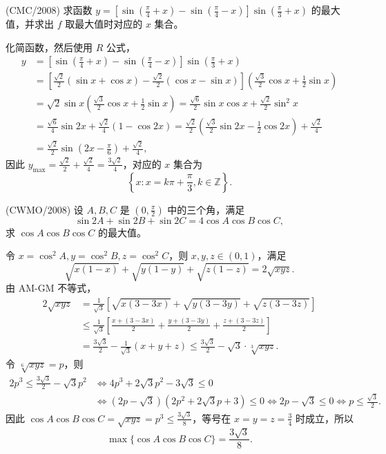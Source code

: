 \begin{questions}
\question (CMC/2008) 求函数 $y = \left[ \sin \left( \frac{\pi}{4} + x \right) - \sin \left( \frac{\pi}{4} - x \right) \right] \sin \left( \frac{\pi}{3} + x \right)$ 的最大值，并求出 $f$ 取最大值时对应的 $x$ 集合。
\begin{solution}
化简函数，然后使用 $R$ 公式，
\begin{align*}
y &= \left[ \sin \left( \frac{\pi}{4} + x \right) - \sin \left( \frac{\pi}{4} - x \right) \right] \sin \left( \frac{\pi}{3} + x \right) \\
&= \left[ \frac{\sqrt{2}}{2} (\sin x + \cos x) - \frac{\sqrt{2}}{2} (\cos x - \sin x) \right] \left( \frac{\sqrt{3}}{2} \cos x + \frac{1}{2} \sin x \right) \\
&= \sqrt{2} \sin x \left( \frac{\sqrt{3}}{2} \cos x + \frac{1}{2} \sin x \right) = \frac{\sqrt{6}}{2} \sin x \cos x + \frac{\sqrt{2}}{2} \sin^2 x \\
&= \frac{\sqrt{6}}{4} \sin 2x + \frac{\sqrt{2}}{4} (1 - \cos 2x) = \frac{\sqrt{2}}{2} \left( \frac{\sqrt{3}}{2} \sin 2x - \frac{1}{2} \cos 2x \right) + \frac{\sqrt{2}}{4} \\
&= \frac{\sqrt{2}}{2} \sin \left( 2x - \frac{\pi}{6} \right) + \frac{\sqrt{2}}{4},
\end{align*}
因此 $y_{\max} = \frac{\sqrt{2}}{2} + \frac{\sqrt{2}}{4} = \frac{3\sqrt{2}}{4}$，对应的 $x$ 集合为
\[
\left\{ x : x = k\pi + \frac{\pi}{3}, k \in \mathbb{Z} \right\}.
\]
\end{solution}

\question (CWMO/2008) 设 $A, B, C$ 是 $\left( 0, \frac{\pi}{2} \right)$ 中的三个角，满足
\[
\sin 2A + \sin 2B + \sin 2C = 4 \cos A \cos B \cos C,
\]
求 $\cos A \cos B \cos C$ 的最大值。
\begin{solution}
令 $x = \cos^2 A, y = \cos^2 B, z = \cos^2 C$，则 $x, y, z \in (0, 1)$，满足
\[
\sqrt{x(1 - x)} + \sqrt{y(1 - y)} + \sqrt{z(1 - z)} = 2 \sqrt{xyz}.
\]
由 AM-GM 不等式，
\begin{align*}
2\sqrt{xyz} &= \frac{1}{\sqrt{3}} \left[ \sqrt{x(3 - 3x)} + \sqrt{y(3 - 3y)} + \sqrt{z(3 - 3z)} \right] \\
&\le \frac{1}{\sqrt{3}} \left[ \frac{x + (3 - 3x)}{2} + \frac{y + (3 - 3y)}{2} + \frac{z + (3 - 3z)}{2} \right] \\
&= \frac{3\sqrt{3}}{2} - \frac{1}{\sqrt{3}} (x + y + z) \le \frac{3\sqrt{3}}{2} - \sqrt{3} \cdot \sqrt[3]{xyz}.
\end{align*}
令 $\sqrt[6]{xyz} = p$，则
\begin{align*}
2p^3 \le \frac{3\sqrt{3}}{2} - \sqrt{3} p^2 &\Leftrightarrow 4p^3 + 2\sqrt{3} p^2 - 3\sqrt{3} \le 0 \\
&\Leftrightarrow (2p - \sqrt{3})(2p^2 + 2\sqrt{3} p + 3) \le 0 \Leftrightarrow 2p - \sqrt{3} \le 0 \Leftrightarrow p \le \frac{\sqrt{3}}{2}.
\end{align*}
因此 $\cos A \cos B \cos C = \sqrt{xyz} = p^3 \le \frac{3\sqrt{3}}{8}$，等号在 $x = y = z = \frac{3}{4}$ 时成立，所以
\[
\max \{ \cos A \cos B \cos C \} = \frac{3\sqrt{3}}{8}.
\]
\end{solution}


\end{questions}
